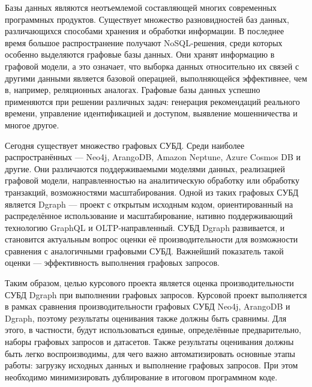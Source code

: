 

Базы данных являются неотъемлемой составляющей многих современных программных продуктов. Существует
множество разновидностей баз данных, различающихся способами хранения и обработки информации. В
последнее время большое распространение получают NoSQL-решения, среди которых особенно выделяются
графовые базы данных. Они хранят информацию в графовой модели, а это означает, что выборка данных
относительно их связей с другими данными является базовой операцией, выполняющейся эффективнее, чем в,
например, реляционных аналогах. Графовые базы данных успешно применяются при решении различных задач:
генерация рекомендаций реального времени, управление идентификацией и доступом, выявление мошенничества
и многое другое.

Сегодня существует множество графовых СУБД. Среди наиболее распространённых --- Neo4j, ArangoDB,
Amazon Neptune, Azure Cosmos DB и другие. Они различаются поддерживаемыми моделями данных, реализацией
графовой модели, направленностью на аналитическую обработку или обработку транзакций, возможностями
масштабирования. Одной из таких графовых СУБД является Dgraph --- проект с открытым исходным кодом,
ориентированный на распределённое использование и масштабирование, нативно поддерживающий технологию
GraphQL и OLTP-направленный. СУБД Dgraph развивается, и становится актуальным вопрос оценки
её производительности для возможности сравнения с аналогичными графовыми СУБД. Важнейший показатель
такой оценки --- эффективность выполнения графовых запросов.

Таким образом, целью курсового проекта является оценка производительности СУБД Dgraph при
выполнении графовых запросов. Курсовой проект выполняется в рамках сравнения производительности
графовых СУБД Neo4j, ArangoDB и Dgraph, поэтому результаты оценивания также должны быть сравнимы.
Для этого, в частности, будут использоваться единые, определённые предварительно, наборы графовых
запросов и датасетов. Также результаты оценивания должны быть легко воспроизводимы, для чего важно
автоматизировать основные этапы работы: загрузку исходных данных и выполнение графовых запросов.
При этом необходимо минимизировать дублирование в итоговом программном коде.

